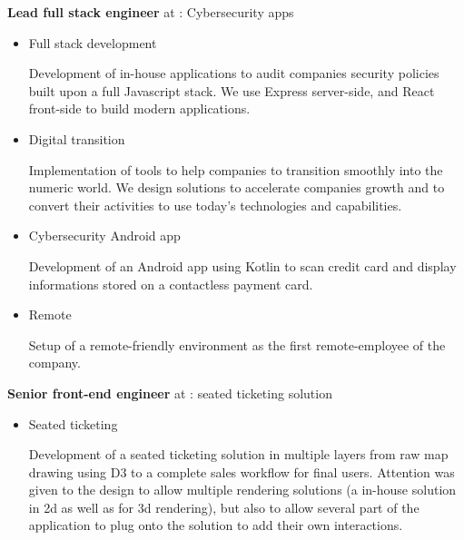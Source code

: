 \begin{rubric}{
}


\textbf{Lead full stack engineer} at : Cybersecurity apps
\begin{itemize}

\item Full stack development

Development of in-house applications to audit companies security policies built upon a full Javascript stack. We use Express server-side, and React front-side to build modern applications.

\item Digital transition

Implementation of tools to help companies to transition smoothly into the numeric world. We design solutions to accelerate companies growth and to convert their activities to use today's technologies and capabilities.

\item Cybersecurity Android app

Development of an Android app using Kotlin to scan credit card and display informations stored on a contactless payment card.

\item Remote

Setup of a remote-friendly environment as the first remote-employee of the company.

\end{itemize}

\textbf{Senior front-end engineer} at : seated ticketing solution

\begin{itemize}
\item Seated ticketing

Development of a seated ticketing solution in multiple layers from raw map drawing using D3 to 
a complete sales workflow for final users. Attention was given to the design to allow multiple rendering
solutions (a in-house solution in 2d as well as  for 3d rendering),
but also to allow several part of the application to plug onto the solution to add their own interactions.


\end{itemize}
\end{rubric}
